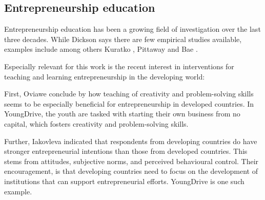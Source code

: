 \subsection{Entrepreneurship education}

%

%




Entrepreneurship education has been a growing field of investigation over the last three decades. While Dickson \cite{dickson} says there are few empirical studies available, examples include among others Kuratko \cite{kuratko}, Pittaway \cite{pittaway} and Bae \cite{bae}.

Especially relevant for this work is the recent interest in interventions for teaching and learning entrepreneurship in the developing world: \cite{oviawe} \cite{iakovleva}



First, Oviawe \cite{oviawe} conclude by how teaching of creativity and problem-solving skills seems to be especially beneficial for entrepreneurship in developed countries. In YoungDrive, the youth are tasked with starting their own business from no capital, which fosters creativity and problem-solving skills.

Further, Iakovleva \cite{iakovleva} indicated that respondents from developing countries do have stronger entrepreneurial intentions than those from developed countries. This stems from attitudes, subjective norms, and perceived behavioural control. Their encouragement, is that developing countries need to focus on the development of institutions that
can support entrepreneurial efforts. YoungDrive is one such example.

